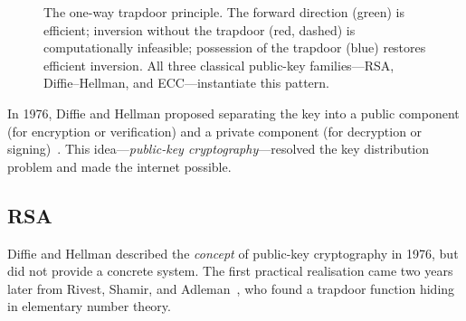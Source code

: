 \begin{figure}[t]
\centering
{}
\caption{The one-way trapdoor principle.  The forward direction (green) is efficient; inversion without the trapdoor (red, dashed) is computationally infeasible; possession of the trapdoor (blue) restores efficient inversion.  All three classical public-key families---RSA, Diffie--Hellman, and ECC---instantiate this pattern.}
\label{fig:ch03-trapdoor}
\end{figure}

In 1976, Diffie and Hellman proposed separating the key into a public component (for encryption or verification) and a private component (for decryption or signing)~\cite{DiffieHellman1976}.  This idea---\emph{public-key cryptography}---resolved the key distribution problem and made the internet possible.

\subsection{RSA}
\label{subsec:rsa}

Diffie and Hellman described the \emph{concept} of public-key cryptography in 1976, but did not provide a concrete system.  The first practical realisation came two years later from Rivest, Shamir, and Adleman~\cite{RSA1978}, who found a trapdoor function hiding in elementary number theory.

